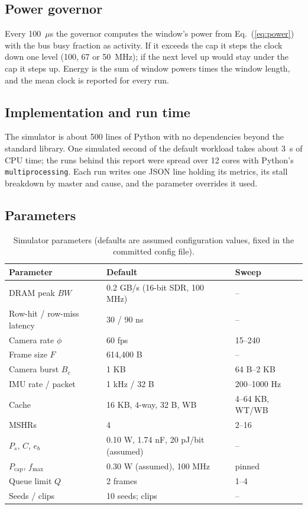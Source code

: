\documentclass[11pt,a4paper]{article}
\begin{document}
\subsection{Power governor}
Every 100~$\mu$s the governor computes the window's power from Eq.~(\ref{eq:power}) with the bus busy fraction as activity. If it exceeds the cap it steps the clock down one level (100, 67 or 50~MHz); if the next level up would stay under the cap it steps up. Energy is the sum of window powers times the window length, and the mean clock is reported for every run.

\subsection{Implementation and run time}
The simulator is about 500 lines of Python with no dependencies beyond the standard library. One simulated second of the default workload takes about 3~s of CPU time; the \nRuns{} runs behind this report were spread over 12 cores with Python's \texttt{multiprocessing}. Each run writes one JSON line holding its metrics, its stall breakdown by master and cause, and the parameter overrides it used.

\subsection{Parameters}
\begin{table}[h]\centering\caption{Simulator parameters (defaults are assumed configuration values, fixed in the committed config file).}
\begin{tabular}{@{}lll@{}}\toprule Parameter & Default & Sweep\\\midrule
DRAM peak $BW$ & 0.2 GB/s (16-bit SDR, 100 MHz) & --\\
Row-hit / row-miss latency & 30 / 90 ns & --\\
Camera rate $\phi$ & 60 fps & 15--240\\
Frame size $F$ & 614{,}400 B & --\\
Camera burst $B_c$ & 1 KB & 64 B--2 KB\\
IMU rate / packet & 1 kHz / 32 B & 200--1000 Hz\\
Cache & 16 KB, 4-way, 32 B, WB & 4--64 KB, WT/WB\\
MSHRs & 4 & 2--16\\
$P_s$, $C$, $e_b$ & 0.10 W, 1.74 nF, 20 pJ/bit (assumed) & --\\
$P_{\mathrm{cap}}$, $f_{\max}$ & 0.30 W (assumed), 100 MHz & pinned\\
Queue limit $Q$ & 2 frames & 1--4\\
Seeds / clips & 10 seeds; \nClips{} clips & --\\\bottomrule\end{tabular}\end{table}
\end{document}
